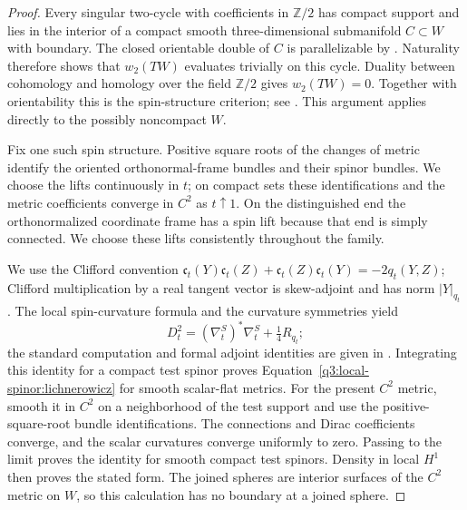 \begin{proof}
Every singular two-cycle with coefficients in $\mathbb Z/2$ has
compact support and lies in the interior of a compact smooth
three-dimensional submanifold $C\subset W$ with boundary.
The closed orientable double of $C$ is parallelizable by
\cite[Theorem 1.1]{BenedettiLisca2018}.  Naturality therefore shows
that $w_2(TW)$ evaluates trivially on this cycle.  Duality between
cohomology and homology over the field $\mathbb Z/2$ gives
$w_2(TW)=0$.  Together with orientability this is the spin-structure
criterion; see \cite[Chapter II, Sections 1--2]{LawsonMichelsohn1989}.
This argument applies directly to the possibly noncompact $W$.

Fix one such spin structure.  Positive square roots of the changes
of metric identify the oriented orthonormal-frame bundles and their
spinor bundles.  We choose the lifts continuously in $t$; on compact
sets these identifications and the metric coefficients converge in
$C^2$ as $t\uparrow1$.  On the distinguished end the orthonormalized
coordinate frame has a spin lift because that end is simply
connected.  We choose these lifts consistently throughout the family.

We use the Clifford convention
$\mathfrak c_t(Y)\mathfrak c_t(Z)+\mathfrak c_t(Z)\mathfrak c_t(Y)
=-2q_t(Y,Z)$; Clifford multiplication by a real tangent vector is
skew-adjoint and has norm $|Y|_{q_t}$.  The local spin-curvature
formula and the curvature symmetries yield
\[
 D_t^2=(\nabla^S_t)^*\nabla^S_t+\tfrac14R_{q_t};
\]
the standard computation and formal adjoint identities are given in
\cite[Chapter~II, Sections~4--5 and~8]{LawsonMichelsohn1989}.
Integrating this identity for a compact test spinor proves
Equation~\eqref{q3:local-spinor:lichnerowicz} for smooth scalar-flat metrics.
For the present $C^2$ metric, smooth it in $C^2$ on a neighborhood
of the test support and use the positive-square-root bundle
identifications.  The connections and Dirac coefficients converge,
and the scalar curvatures converge uniformly to zero.  Passing to
the limit proves the identity for smooth compact test spinors.
Density in local $H^1$ then proves the stated form.  The joined
spheres are interior surfaces of the $C^2$ metric on $W$, so this
calculation has no boundary at a joined sphere.
\end{proof}

